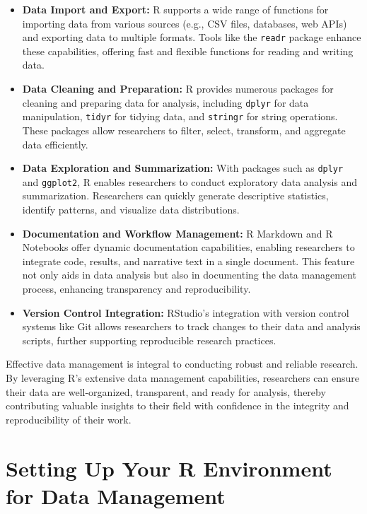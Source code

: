 \documentclass[
]{book}
\begin{document}
\begin{itemize}
\item
  \textbf{Data Import and Export:} R supports a wide range of functions for importing data from various sources (e.g., CSV files, databases, web APIs) and exporting data to multiple formats. Tools like the \texttt{readr} package enhance these capabilities, offering fast and flexible functions for reading and writing data.
\item
  \textbf{Data Cleaning and Preparation:} R provides numerous packages for cleaning and preparing data for analysis, including \texttt{dplyr} for data manipulation, \texttt{tidyr} for tidying data, and \texttt{stringr} for string operations. These packages allow researchers to filter, select, transform, and aggregate data efficiently.
\item
  \textbf{Data Exploration and Summarization:} With packages such as \texttt{dplyr} and \texttt{ggplot2}, R enables researchers to conduct exploratory data analysis and summarization. Researchers can quickly generate descriptive statistics, identify patterns, and visualize data distributions.
\item
  \textbf{Documentation and Workflow Management:} R Markdown and R Notebooks offer dynamic documentation capabilities, enabling researchers to integrate code, results, and narrative text in a single document. This feature not only aids in data analysis but also in documenting the data management process, enhancing transparency and reproducibility.
\item
  \textbf{Version Control Integration:} RStudio's integration with version control systems like Git allows researchers to track changes to their data and analysis scripts, further supporting reproducible research practices.
\end{itemize}

Effective data management is integral to conducting robust and reliable research. By leveraging R's extensive data management capabilities, researchers can ensure their data are well-organized, transparent, and ready for analysis, thereby contributing valuable insights to their field with confidence in the integrity and reproducibility of their work.

\hypertarget{setting-up-your-r-environment-for-data-management}{%
\section{Setting Up Your R Environment for Data Management}\label{setting-up-your-r-environment-for-data-management}}
\end{document}

